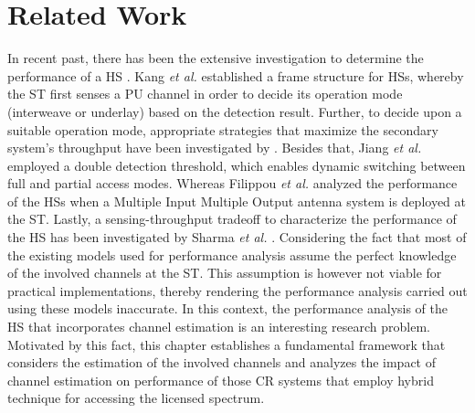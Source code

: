 \section{Related Work}


In recent past, there has been the extensive investigation to determine the performance of a HS \cite{Kang09, Oh10, Senthu12, Song13, Gmira15, Jiang13, Fili15, Sharma14}. Kang \textit{et al.} \cite{Kang09} established a frame structure for HSs, whereby the ST first senses a PU channel in order to decide its operation mode (interweave or underlay) based on the detection result. Further, to decide upon a suitable operation mode, appropriate strategies that maximize the secondary system's throughput have been investigated by \cite{Oh10, Senthu12, Song13, Gmira15}. Besides that, Jiang \textit{et al.} employed a double detection threshold, which enables dynamic switching between full and partial access modes. Whereas Filippou \textit{et al.} \cite{Fili15} analyzed the performance of the HSs when a Multiple Input Multiple Output antenna system is deployed at the ST. Lastly, a sensing-throughput tradeoff to characterize the performance of the HS has been investigated by Sharma \textit{et al.} \cite{Sharma14}. 
Considering the fact that most of the existing models \cite{Kang09, Oh10, Senthu12, Song13, Gmira15, Jiang13, Fili15, Sharma14} used for performance analysis assume the perfect knowledge of the involved channels at the ST. This assumption is however not viable for practical implementations, thereby rendering the performance analysis carried out using these models inaccurate. In this context, the performance analysis of the HS that incorporates channel estimation is an interesting research problem. Motivated by this fact, this chapter establishes a fundamental framework that considers the estimation of the involved channels and analyzes the impact of channel estimation on performance of those CR systems that employ hybrid technique for accessing the licensed spectrum.
